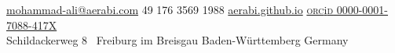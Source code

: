 \documentclass[10pt,a4paper]{article}
\begin{document}
\sloppy  %



\nobreakvspace{0.3em}  %

\noindent\href{mailto:aerabi.at.gmx.dot.de}{mohammad-ali\mbox{}@\mbox{}aerabi.com}\sbull
\textsmaller{+}49 176 3569 1988\sbull
\href{http://aerabi.github.io}{aerabi.github.io}\sbull 
\href{https://orcid.org/0000-0001-7088-417X}{\textsc{orc}i\textsc{d} 0000-0001-7088-417X} \\
Schildackerweg 8 \thinspace\ {\sc Freiburg im Breisgau}\sbull
Baden-W\"urttemberg\sbull
{\sc Germany}

\spacedhrule{0.9em}{-0.4em}  %

\end{document}
